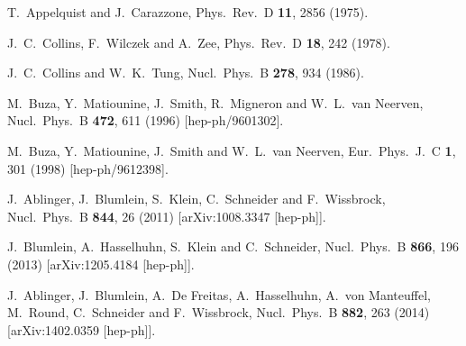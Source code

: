 \documentclass[letter,11pt]{article}
\begin{document}
\begin{thebibliography}{99}
  T.~Appelquist and J.~Carazzone,
  Phys.\ Rev.\ D {\bf 11}, 2856 (1975).
  
  J.~C.~Collins, F.~Wilczek and A.~Zee,
  Phys.\ Rev.\ D {\bf 18}, 242 (1978).
  
  J.~C.~Collins and W.~K.~Tung,
  Nucl.\ Phys.\ B {\bf 278}, 934 (1986).

  M.~Buza, Y.~Matiounine, J.~Smith, R.~Migneron and W.~L.~van Neerven,
  Nucl.\ Phys.\ B {\bf 472}, 611 (1996)
  [hep-ph/9601302].
  
  M.~Buza, Y.~Matiounine, J.~Smith and W.~L.~van Neerven,
  Eur.\ Phys.\ J.\ C {\bf 1}, 301 (1998)
  [hep-ph/9612398].

  J.~Ablinger, J.~Blumlein, S.~Klein, C.~Schneider and F.~Wissbrock,
  Nucl.\ Phys.\ B {\bf 844}, 26 (2011)
  [arXiv:1008.3347 [hep-ph]].

  J.~Blumlein, A.~Hasselhuhn, S.~Klein and C.~Schneider,
  Nucl.\ Phys.\ B {\bf 866}, 196 (2013)
  [arXiv:1205.4184 [hep-ph]].

  J.~Ablinger, J.~Blumlein, A.~De Freitas, A.~Hasselhuhn, A.~von Manteuffel, M.~Round, C.~Schneider and F.~Wissbrock,
  Nucl.\ Phys.\ B {\bf 882}, 263 (2014)
  [arXiv:1402.0359 [hep-ph]].


\end{thebibliography}
\end{document}
